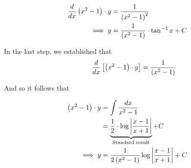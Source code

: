 \documentclass[14pt,fleqn]{extarticle}
\begin{document}
\newcard 

\begin{align}
	\frac{d}{dx} \left(x^2-1 \right)\cdot y &= \frac{1}{\left(x^2-1 \right)^2} \\
	\implies y &= \frac{1}{\left(x^2-1 \right)}\cdot\tan^{-1} x + C 
\end{align} 

\newcard 

In the last step, we established that 
\[ \qquad \frac{d}{dx} \left[\left(x^2-1 \right)\cdot y \right] = \frac{1}{\left(x^2-1 \right)}\]

And so it follows that 

\begin{align}
\left(x^2-1 \right)\cdot y &= \int \frac{dx}{x^2-1} \\
&= \underbrace{\frac{1}{2}\cdot \log \left\vert \frac{x-1}{x+1}\right\vert}_{\text{Standard result}} + C  \\
\implies y &= \frac{1}{2\left(x^2-1 \right)}\log \left\vert \frac{x-1}{x+1}\right\vert + C 
\end{align}
\end{document}
